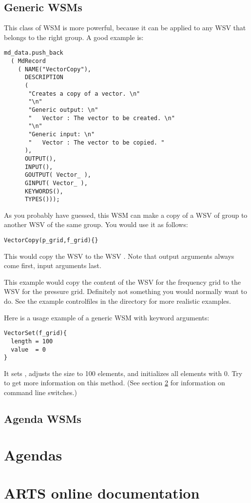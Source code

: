 \subsection{Generic WSMs}

This class of WSM is more powerful, because it can be applied to any
WSV that belongs to the right group. A good example is:

{\small
\begin{verbatim}
md_data.push_back
  ( MdRecord
    ( NAME("VectorCopy"),
      DESCRIPTION
      (
       "Creates a copy of a vector. \n"
       "\n"
       "Generic output: \n"
       "   Vector : The vector to be created. \n"
       "\n"
       "Generic input: \n"
       "   Vector : The vector to be copied. "
      ),
      OUTPUT(),
      INPUT(),
      GOUTPUT( Vector_ ),
      GINPUT( Vector_ ),
      KEYWORDS(),
      TYPES()));
\end{verbatim}
}

\noindent
As you probably have guessed, this WSM can make a copy of a WSV of
group  to another WSV of the same group. You would
use it as follows: 

{\small
\begin{verbatim}
VectorCopy(p_grid,f_grid){} 
\end{verbatim}
}

\noindent
This would copy the WSV  to the WSV
.  Note that output arguments always come first,
input arguments last.

This example would copy the content of the WSV for the frequency grid
to the WSV for the pressure grid. Definitely not something you would
normally want to do. See the example controlfiles in the
 directory for more realistic examples. 

Here is a usage example of a generic WSM with keyword arguments:

{\small
\begin{verbatim}
VectorSet(f_grid){
  length = 100
  value  = 0
}
\end{verbatim}
}

\noindent
It sets , adjusts the size to 100 elements, and
initializes all elements with 0. Try  to
get more information on this method. (See section
\ref{sec:online-docu} for information on command line switches.)

\subsection{Agenda WSMs}


\section{Agendas}
\label{sec:agendas:agendas}


\section{ARTS online documentation}
\label{sec:online-docu}



